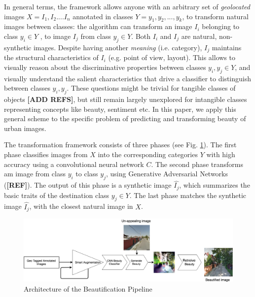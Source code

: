 In general terms, the framework allows anyone with an arbitrary set of \emph{geolocated} images $ X = { I_1, I_2 ... . I_n  }$ annotated in classes $Y = {y_1 , y_2 , ... ,y_k}$, to transform natural images between classes: the algorithm can transform an  image $I_i$ belonging to class $y_i \in Y$ , to image $I_j$ from class $y_j \in Y$. Both $I_i$ and $I_j$ are natural, non-synthetic images. Despite having another \emph{meaning} (i.e. category), $I_j$ maintains the structural characteristics of $I_i$ (e.g. point of view, layout).  This allows  to visually reason about the discriminative properties between classes $y_i , y_j \in Y$, and visually understand the salient characteristics that drive a classifier to distinguish between  classes $y_i,y_j$. These questions might be trivial for tangible classes of objects \textbf{[ADD REFS]}, but still remain largely unexplored for intangible classes representing concepts like beauty, sentiment etc.  In this paper, we apply this general scheme to the specific problem of predicting and transforming beauty of urban images.

\par 
The transformation framework consists of three phases (see Fig. \ref{fig:pipeline}). The first phase %
classifies images from $X$ into the corresponding categories $Y$ with high accuracy using a convolutional neural network $C$. %
The second phase transforms am image from class $y_i$ to class $y_j$, using Generative Adversarial Networks (\textbf{[REF]}). The output of this phase is a synthetic image $\hat{I_j}$, which summarizes the basic traits of the destination class $y_j \in Y$. The last phase matches the synthetic image $\hat{I_j}$,  with the closest natural image in $X$.


%
 \begin{figure}[ht]
	\centering
	\includegraphics[width=2\columnwidth]{Plot/UrbanEmotionsPipeline.png}
	\caption{Architecture of the Beautification Pipeline}
    \label{fig:pipeline}
\end{figure}

